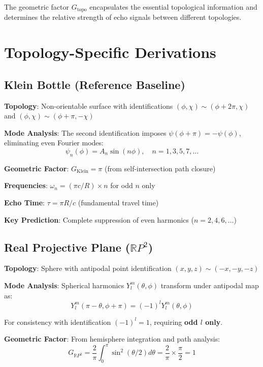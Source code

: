 \documentclass[11pt,a4paper]{article}
\begin{document}
The geometric factor $G_{\text{topo}}$ encapsulates the essential topological information and determines the relative strength of echo signals between different topologies.

\section{Topology-Specific Derivations}

\subsection{Klein Bottle (Reference Baseline)}

\textbf{Topology}: Non-orientable surface with identifications $(\phi, \chi) \sim (\phi + 2\pi, \chi)$ and $(\phi, \chi) \sim (\phi + \pi, -\chi)$

\textbf{Mode Analysis}: The second identification imposes $\psi(\phi+\pi) = -\psi(\phi)$, eliminating even Fourier modes:
\begin{equation}
\psi_n(\phi) = A_n \sin(n\phi), \quad n = 1, 3, 5, 7, \ldots
\end{equation}

\textbf{Geometric Factor}: $G_{\text{Klein}} = \pi$ (from self-intersection path closure)

\textbf{Frequencies}: $\omega_n = (\pi c/R) \times n$ for odd $n$ only

\textbf{Echo Time}: $\tau = \pi R/c$ (fundamental travel time)

\textbf{Key Prediction}: Complete suppression of even harmonics ($n = 2, 4, 6, \ldots$)

\subsection{Real Projective Plane ($\mathbb{R}P^2$)}

\textbf{Topology}: Sphere with antipodal point identification $(x,y,z) \sim (-x,-y,-z)$

\textbf{Mode Analysis}: Spherical harmonics $Y_l^m(\theta,\phi)$ transform under antipodal map as:
\begin{equation}
Y_l^m(\pi-\theta, \phi+\pi) = (-1)^l Y_l^m(\theta,\phi)
\end{equation}

For consistency with identification $(-1)^l = 1$, requiring \textbf{odd $l$ only}.

\textbf{Geometric Factor}: From hemisphere integration and path analysis:
\begin{equation}
G_{\mathbb{R}P^2} = \frac{2}{\pi} \int_0^\pi \sin^2(\theta/2) d\theta = \frac{2}{\pi} \times \frac{\pi}{2} = 1
\end{equation}
\end{document}
